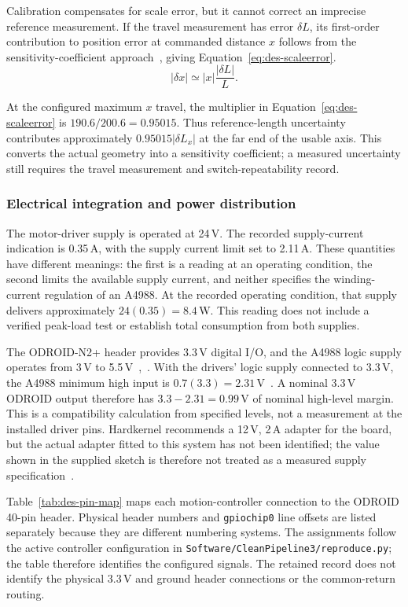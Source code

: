 Calibration compensates for scale error, but it cannot correct an imprecise reference measurement. If the travel measurement has error $\delta L$, its first-order contribution to position error at commanded distance $x$ follows from the sensitivity-coefficient approach~\cite[pp.~18--19]{jcgm2008}, giving Equation~\ref{eq:des-scaleerror}.
\begin{equation}
|\delta x|\simeq |x|\frac{|\delta L|}{L}.
\label{eq:des-scaleerror}
\end{equation}

At the configured maximum $x$ travel, the multiplier in Equation~\ref{eq:des-scaleerror} is $190.6/200.6=0.95015$. Thus reference-length uncertainty contributes approximately $0.95015|\delta L_x|$ at the far end of the usable axis. This converts the actual geometry into a sensitivity coefficient; a measured uncertainty still requires the travel measurement and switch-repeatability record.

\subsubsection{Electrical integration and power distribution}
\label{sec:des-power}
The motor-driver supply is operated at 24\,V. The recorded supply-current indication is 0.35\,A, with the supply current limit set to 2.11\,A. These quantities have different meanings: the first is a reading at an operating condition, the second limits the available supply current, and neither specifies the winding-current regulation of an A4988. At the recorded operating condition, that supply delivers approximately $24(0.35)=8.4$\,W. This reading does not include a verified peak-load test or establish total consumption from both supplies.

The ODROID-N2+ header provides 3.3\,V digital I/O, and the A4988 logic supply operates from 3\,V to 5.5\,V~\cite{odroidn2ds},~\cite[p.~5]{a4988ds}. With the drivers' logic supply connected to 3.3\,V, the A4988 minimum high input is $0.7(3.3)=2.31$\,V~\cite[p.~4]{a4988ds}. A nominal 3.3\,V ODROID output therefore has $3.3-2.31=0.99$\,V of nominal high-level margin. This is a compatibility calculation from specified levels, not a measurement at the installed driver pins. Hardkernel recommends a 12\,V, 2\,A adapter for the board, but the actual adapter fitted to this system has not been identified; the value shown in the supplied sketch is therefore not treated as a measured supply specification~\cite{odroidn2ds}.

Table~\ref{tab:des-pin-map} maps each motion-controller connection to the ODROID 40-pin header. Physical header numbers and \texttt{gpiochip0} line offsets are listed separately because they are different numbering systems. The assignments follow the active controller configuration in \texttt{Software/CleanPipeline3/reproduce.py}; the table therefore identifies the configured signals. The retained record does not identify the physical 3.3\,V and ground header connections or the common-return routing.



